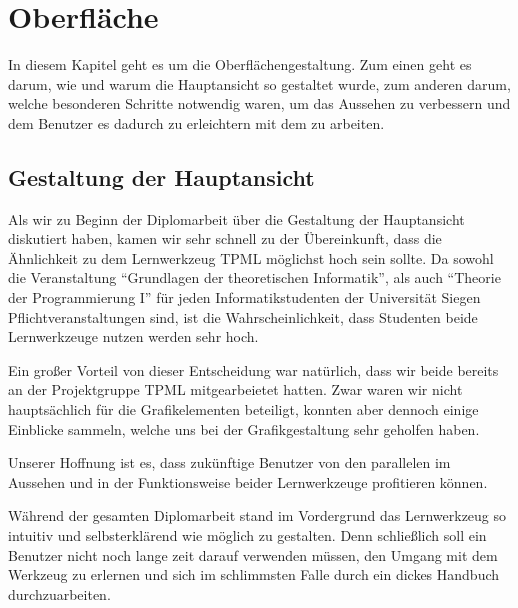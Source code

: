 

\chapter{Oberfläche}\label{GUI}

In diesem Kapitel geht es um die Oberflächengestaltung. Zum einen geht es darum,
wie und warum die Hauptansicht so gestaltet wurde, zum anderen darum, welche
besonderen Schritte notwendig waren, um das Aussehen zu verbessern und dem
Benutzer es dadurch zu erleichtern mit dem \gtitool zu arbeiten.
\vspace{10pt}


\section{Gestaltung der Hauptansicht}

Als wir zu Beginn der Diplomarbeit über die Gestaltung der Hauptansicht
diskutiert haben, kamen wir sehr schnell zu der Übereinkunft, dass die
Ähnlichkeit zu dem Lernwerkzeug TPML möglichst hoch sein sollte. Da sowohl die
Veranstaltung "`Grundlagen der theoretischen Informatik"', als auch "`Theorie
der Programmierung I"' für jeden Informatikstudenten der Universität Siegen
Pflichtveranstaltungen sind, ist die Wahrscheinlichkeit, dass Studenten beide
Lernwerkzeuge nutzen werden sehr hoch.\vspace{10pt}

Ein großer Vorteil von dieser Entscheidung war natürlich, dass wir beide
bereits an der Projektgruppe TPML mitgearbeietet hatten. Zwar waren wir nicht
hauptsächlich für die Grafikelementen beteiligt, konnten aber dennoch einige
Einblicke sammeln, welche uns bei der Grafikgestaltung sehr geholfen
haben.\vspace{10pt}

Unserer Hoffnung ist es, dass zukünftige Benutzer von den parallelen im Aussehen
und in der Funktionsweise beider Lernwerkzeuge profitieren können.\vspace{10pt}

Während der gesamten Diplomarbeit stand im Vordergrund das Lernwerkzeug so
intuitiv und selbsterklärend wie möglich zu gestalten. Denn schließlich soll
ein Benutzer nicht noch lange zeit darauf verwenden müssen, den Umgang mit dem
Werkzeug zu erlernen und sich im schlimmsten Falle durch ein dickes Handbuch
durchzuarbeiten.\vspace{10pt}

